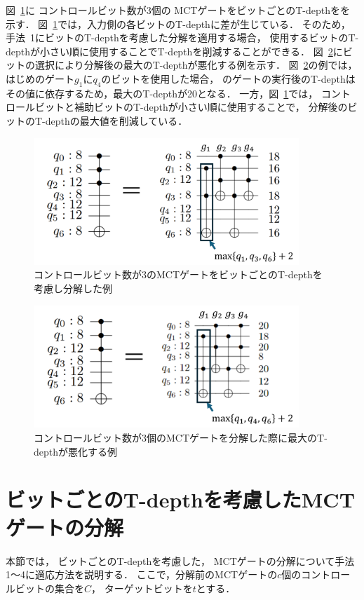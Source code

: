 \par
図~\ref{consider_tdepth}に
コントロールビット数が3個の
MCTゲートをビットごとのT-depthをを示す．
図~\ref{consider_tdepth}では，入力側の各ビットのT-depthに差が生じている．
そのため，手法~1にビットのT-depthを考慮した分解を適用する場合，
使用するビットのT-depthが小さい順に使用することでT-depthを削減することができる．
図~\ref{bad_consider_tdepth}にビットの選択により分解後の最大のT-depthが悪化する例を示す．
図~\ref{bad_consider_tdepth}の例では，
はじめのゲート$g_{1}$に$q_{4}$のビットを使用した場合，
のゲートの実行後のT-depthはその値に依存するため，最大のT-depthが20となる．
一方，図~\ref{consider_tdepth}では，
コントロールビットと補助ビットのT-depthが小さい順に使用することで，
分解後のビットのT-depthの最大値を削減している．
\begin{figure}[tbp]
  \centering
  \includegraphics[width=10cm]{img/considering_bit_tdepth.pdf}
  \caption{コントロールビット数が3のMCTゲートをビットごとのT-depthを考慮し分解した例}
  \label{consider_tdepth}
\end{figure}
\begin{figure}[tbp]
  \centering
  \includegraphics[width=10cm]{img/bad_consider_t-depth.pdf}
  \caption{コントロールビット数が3個のMCTゲートを分解した際に最大のT-depthが悪化する例}
  \label{bad_consider_tdepth}
\end{figure}
\section{ビットごとのT-depthを考慮したMCTゲートの分解}
本節では，
ビットごとのT-depthを考慮した，
MCTゲートの分解について手法1～4に適応方法を説明する．
ここで，分解前のMCTゲートの$c$個のコントロールビットの集合を$C$，
ターゲットビットを$t$とする．
